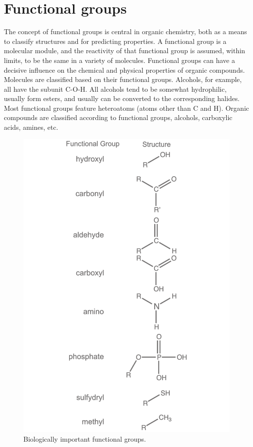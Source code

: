 \hypertarget{functional-groups}{%
\section{Functional groups}\label{functional-groups}}

The concept of functional groups is central in organic chemistry, both as a means to classify structures and for predicting properties. A functional group is a molecular module, and the reactivity of that functional group is assumed, within limits, to be the same in a variety of molecules. Functional groups can have a decisive influence on the chemical and physical properties of organic compounds. Molecules are classified based on their functional groups. Alcohols, for example, all have the subunit C-O-H. All alcohols tend to be somewhat hydrophilic, usually form esters, and usually can be converted to the corresponding halides. Most functional groups feature heteroatoms (atoms other than C and H). Organic compounds are classified according to functional groups, alcohols, carboxylic acids, amines, etc.



\begin{figure}

{\centering \includegraphics[width=0.7\linewidth]{./figures/chemistry/functional_groups} 

}

\caption{Biologically important functional groups.}\label{fig:fgroups}
\end{figure}

